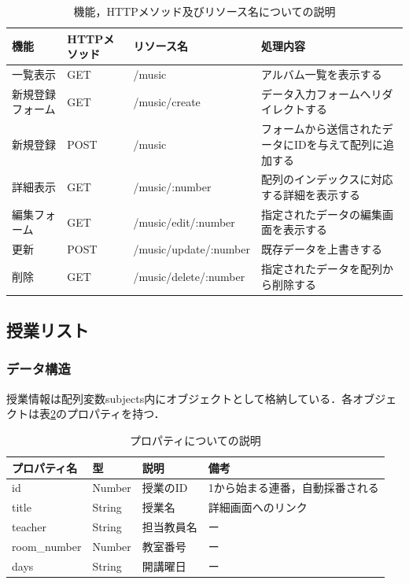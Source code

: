 \documentclass[uplatex,dvipdfmx]{jlreq}
\begin{document}
\begin{table}[htbp]
  \centering
  \begin{tabularx}{\textwidth}{|l|l|l|X|} \hline
    機能 & HTTPメソッド & リソース名 & 処理内容 \\ \hline\hline
    一覧表示 & GET & /music & アルバム一覧を表示する \\ \hline
    新規登録フォーム & GET & /music/create & データ入力フォームへリダイレクトする \\ \hline
    新規登録 & POST & /music & フォームから送信されたデータにIDを与えて配列に追加する \\ \hline
    詳細表示 & GET & /music/:number & 配列のインデックスに対応する詳細を表示する \\ \hline
    編集フォーム & GET & /music/edit/:number & 指定されたデータの編集画面を表示する \\ \hline
    更新 & POST & /music/update/:number & 既存データを上書きする \\ \hline
    削除 & GET & /music/delete/:number & 指定されたデータを配列から削除する \\ \hline
  \end{tabularx}
  \caption{機能，HTTPメソッド及びリソース名についての説明}
  \label{tb:music2}
\end{table}

\subsection{授業リスト}
\subsubsection{データ構造}
授業情報は配列変数subjects内にオブジェクトとして格納している．各オブジェクトは表\ref{tb:subject}のプロパティを持つ．

\begin{table}[htbp]
  \centering
  \begin{tabular}{l|l|l|l}
    プロパティ名 & 型 & 説明 & 備考 \\ \hline\hline
    id & Number & 授業のID & 1から始まる連番，自動採番される \\ \hline
    title & String & 授業名 & 詳細画面へのリンク \\ \hline
    teacher & String & 担当教員名 & ー \\ \hline
    room\_number & Number & 教室番号 & ー \\ \hline
    days & String & 開講曜日 & ー \\ \hline
  \end{tabular}
  \caption{プロパティについての説明}
  \label{tb:subject}
\end{table}
\end{document}

